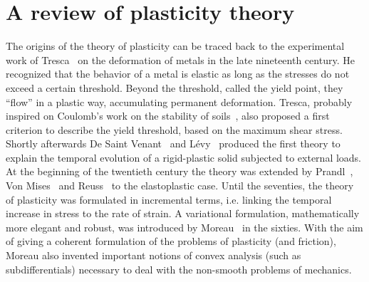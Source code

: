 \documentclass[a4paper,10pt,twoside]{amsbook}
\numberwithin{section}{chapter}
\numberwithin{equation}{chapter}
\theoremstyle{definition}
\begin{document}
\section{A review of plasticity theory}
\label{sec:plasticity-review}


The origins of the theory of plasticity can be traced back to the experimental work of Tresca~\cite{Tresca1872} on the deformation of metals in the late nineteenth century. He recognized that the behavior of a metal is elastic as long as the stresses do not exceed a certain threshold. Beyond the threshold, called the yield point, they ``flow'' in a plastic way, accumulating permanent deformation. Tresca, probably inspired on Coulomb's work on the stability of soils~\cite{Coulomb1776}, also proposed a first criterion to describe the yield threshold, based on the maximum shear stress. Shortly afterwards De Saint Venant~\cite{SaintVenant1871} and Lévy~\cite{Levy1871} produced the first theory to explain the temporal evolution of a rigid-plastic solid subjected to external loads. At the beginning of the twentieth century the theory was extended by Prandl~\cite{Prandtl1924}, Von Mises~\cite{vonMises1928} and Reuss~\cite{Reuss1939} to the elastoplastic case. Until the seventies, the theory of plasticity was formulated in incremental terms, i.e. linking the temporal increase in stress to the rate of strain. A variational formulation, mathematically more elegant and robust, was introduced by Moreau~\cite{Moreau1974} in the sixties. With the aim of giving a coherent formulation of the problems of plasticity (and friction), Moreau also invented important notions of convex analysis (such as subdifferentials) necessary to deal with the non-smooth problems of mechanics.
\end{document}
